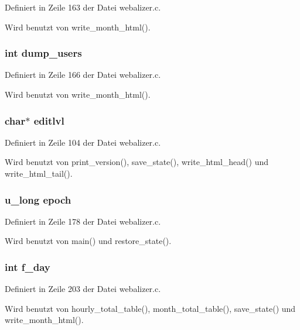 Definiert in Zeile 163 der Datei webalizer.c.

Wird benutzt von write\_\-month\_\-html().
\subsubsection{\setlength{\rightskip}{0pt plus 5cm}int {\bf dump\_\-users}}\label{webalizer_8h_a6b267f406cddbd150680fb2ce5260b1}




Definiert in Zeile 166 der Datei webalizer.c.

Wird benutzt von write\_\-month\_\-html().
\subsubsection{\setlength{\rightskip}{0pt plus 5cm}char$\ast$ {\bf editlvl}}\label{webalizer_8h_59179d90a91f573f3c081592845ee19c}




Definiert in Zeile 104 der Datei webalizer.c.

Wird benutzt von print\_\-version(), save\_\-state(), write\_\-html\_\-head() und write\_\-html\_\-tail().
\subsubsection{\setlength{\rightskip}{0pt plus 5cm}u\_\-long {\bf epoch}}\label{webalizer_8h_71f3fc3b6564ee11c34ff02cee2a3e05}




Definiert in Zeile 178 der Datei webalizer.c.

Wird benutzt von main() und restore\_\-state().
\subsubsection{\setlength{\rightskip}{0pt plus 5cm}int {\bf f\_\-day}}\label{webalizer_8h_4637ce886571ae33e34d7d0ae8d50df8}




Definiert in Zeile 203 der Datei webalizer.c.

Wird benutzt von hourly\_\-total\_\-table(), month\_\-total\_\-table(), save\_\-state() und write\_\-month\_\-html().
